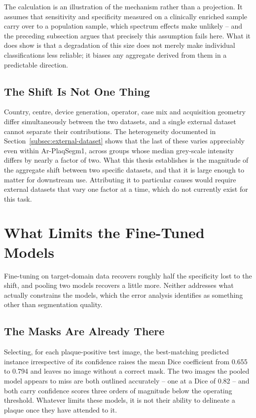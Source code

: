 The calculation is an illustration of the mechanism rather than a projection. It assumes that
sensitivity and specificity measured on a clinically enriched sample carry over to a population
sample, which spectrum effects make unlikely -- and the preceding subsection argues that precisely
this assumption fails here. What it does show is that a degradation of this size does not merely
make individual classifications less reliable; it biases any aggregate derived from them in a
predictable direction.

\subsection{The Shift Is Not One Thing}

Country, centre, device generation, operator, case mix and acquisition geometry differ
simultaneously between the two datasets, and a single external dataset cannot separate their
contributions. The heterogeneity documented in Section~\ref{subsec:external-dataset} shows that
the last of these varies appreciably even within Ar-PlaqSegm1, across groups whose median
grey-scale intensity differs by nearly a factor of two. What this thesis establishes is the
magnitude of the aggregate shift between two specific datasets, and that it is large enough to
matter for downstream use. Attributing it to particular causes would require external datasets
that vary one factor at a time, which do not currently exist for this task.

\section{What Limits the Fine-Tuned Models}
\label{sec:discussion-calibration}

Fine-tuning on target-domain data recovers roughly half the specificity lost to the shift, and
pooling two models recovers a little more. Neither addresses what actually constrains the models,
which the error analysis identifies as something other than segmentation quality.

\subsection{The Masks Are Already There}

Selecting, for each plaque-positive test image, the best-matching predicted instance irrespective
of its confidence raises the mean Dice coefficient from 0.655 to 0.794 and leaves no image
without a correct mask. The two images the pooled model appears to miss are both outlined
accurately -- one at a Dice of 0.82 -- and both carry confidence scores three orders of magnitude
below the operating threshold. Whatever limits these models, it is not their ability to delineate
a plaque once they have attended to it.

